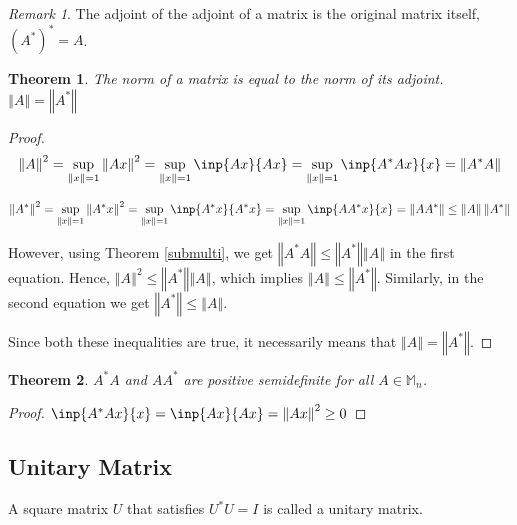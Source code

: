 \documentclass[twofold]{article}
\newcommand*\adj[1]{#1^*}
\newcommand*\norm[1]{\left \Vert #1 \right\Vert}
\theoremstyle{plain}
\newtheorem{theorem}{Theorem}
\theoremstyle{definition}
\theoremstyle{remark}
\newtheorem*{remark}{Remark}
\begin{document}
\begin{remark} The adjoint of the adjoint of a matrix is the original matrix itself, \(\adj{(\adj{A})} = A\). \end{remark}




\begin{theorem} The norm of a matrix is equal to the norm of its adjoint. \(\norm{A} = \norm{\adj{A}}\) \end{theorem}
\begin{proof}
\[ \norm{A}^2   = \sup_{\norm{x} = 1} \norm{Ax}^2  = \sup_{\norm{x} = 1} \inp{Ax}{Ax}  = \sup_{\norm{x} = 1} \inp{\adj{A} A x}{x}  = \norm{\adj{A} A} \]

\[ \norm{\adj{A}}^2   = \sup_{\norm{x} = 1} \norm{\adj{A} x}^2  = \sup_{\norm{x} = 1} \inp{\adj{A}x}{\adj{A}x}  = \sup_{\norm{x} = 1} \inp{A \adj{A} x}{x}  = \norm{A \adj{A}} \le \norm{A} \norm{\adj{A}}\]

However, using  Theorem \ref{submulti}, we get  \(\norm{\adj{A} A} \le \norm{\adj{A}} \norm{A}\) in the first equation. Hence, \(\norm{A}^2 \le \norm{\adj{A}} \norm{A}\), which implies  \(\norm{A} \le \norm{\adj{A}}\). Similarly, in the second equation we get \(\norm{\adj{A}} \le \norm{A}\). 

Since both these inequalities are true, it necessarily means that \(\norm{A} = \norm{\adj{A}}\).
\end{proof}

\begin{theorem}\label{pdm} \(\adj{A} A\) and \(A \adj{A}\) are positive semidefinite for all \(A \in \mathbb{M}_n\). \end{theorem}
\begin{proof} \(\inp{\adj{A} A x}{ x} = \inp{Ax}{Ax} = \norm{Ax}^2 \ge 0\)\end{proof}

\subsection{Unitary Matrix}

A square matrix \(U\) that satisfies \(\adj{U} U = I\) is called a unitary matrix.
\end{document}
